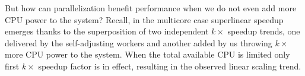 But how can parallelization benefit performance when we do not even add more CPU power to the system? Recall, in the multicore case superlinear speedup emerges thanks to the superposition of two independent $k\times$ speedup trends, one delivered by the self-adjusting workers and another added by us throwing $k\times$ more CPU power to the system. When the total available CPU is limited only first $k\times$ speedup factor is in effect, resulting in the observed linear scaling trend.


%





